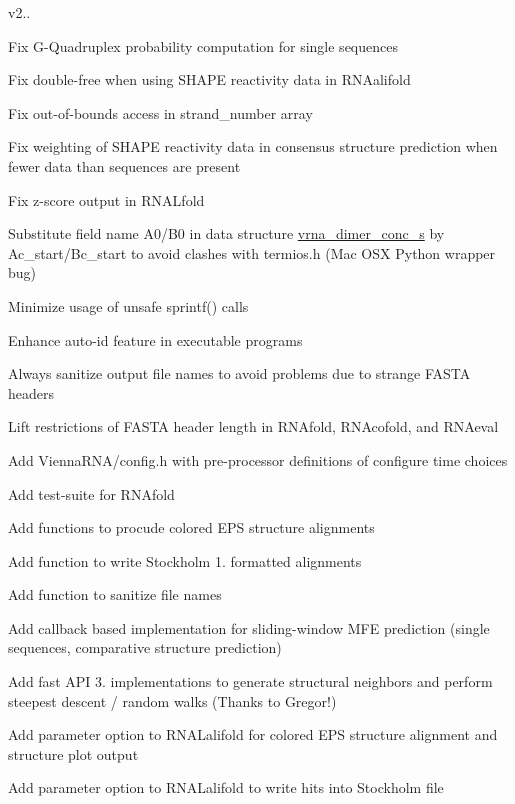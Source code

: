v2..
\begin{DoxyItemize}
\item Fix G-\/\+Quadruplex probability computation for single sequences
\item Fix double-\/free when using S\+H\+A\+PE reactivity data in R\+N\+Aalifold
\item Fix out-\/of-\/bounds access in strand\+\_\+number array
\item Fix weighting of S\+H\+A\+PE reactivity data in consensus structure prediction when fewer data than sequences are present
\item Fix z-\/score output in R\+N\+A\+Lfold
\item Substitute field name \textquotesingle{}A0\textquotesingle{}/\textquotesingle{}B0\textquotesingle{} in data structure \hyperlink{structvrna__dimer__conc__s}{vrna\+\_\+dimer\+\_\+conc\+\_\+s} by \textquotesingle{}Ac\+\_\+start\textquotesingle{}/\textquotesingle{}Bc\+\_\+start\textquotesingle{} to avoid clashes with termios.\+h (Mac O\+SX Python wrapper bug)
\item Minimize usage of \textquotesingle{}unsafe\textquotesingle{} sprintf() calls
\item Enhance auto-\/id feature in executable programs
\item Always sanitize output file names to avoid problems due to strange F\+A\+S\+TA headers
\item Lift restrictions of F\+A\+S\+TA header length in R\+N\+Afold, R\+N\+Acofold, and R\+N\+Aeval
\item Add Vienna\+R\+N\+A/config.\+h with pre-\/processor definitions of configure time choices
\item Add test-\/suite for R\+N\+Afold
\item Add functions to procude colored E\+PS structure alignments
\item Add function to write Stockholm 1. formatted alignments
\item Add function to sanitize file names
\item Add callback based implementation for sliding-\/window M\+FE prediction (single sequences, comparative structure prediction)
\item Add fast A\+PI 3. implementations to generate structural neighbors and perform steepest descent / random walks (Thanks to Gregor!)
\item Add parameter option to R\+N\+A\+Lalifold for colored E\+PS structure alignment and structure plot output
\item Add parameter option to R\+N\+A\+Lalifold to write hits into Stockholm file

\end{DoxyItemize}
